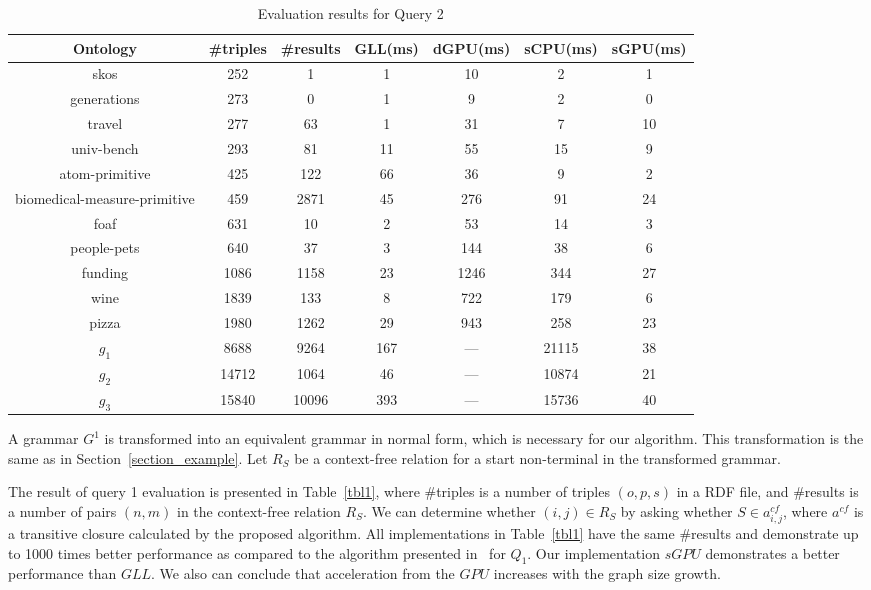 \documentclass[runningheads,a4paper]{llncs}
\begin{document}
\begin{table}[h]
	\centering
	\caption{Evaluation results for Query 2}
	\label{tbl2}
	
	\begin{tabular}{ | c | c | c | c | c | c | c |}
		\hline
		Ontology & \#triples & \#results & GLL(ms) & dGPU(ms) & sCPU(ms) & sGPU(ms) \\
		\hline 
		\hline
		skos        & 252 & 1 & 1 & 10 & 2 & 1\\
		generations & 273 & 0 & 1 & 9 & 2 & 0\\
		travel      & 277 & 63 & 1 & 31 & 7 & 10\\
		univ-bench  & 293 & 81 & 11 & 55 & 15 & 9\\
		atom-primitive & 425 & 122 & 66 & 36 & 9 & 2\\
		biomedical-measure-primitive & 459 & 2871 & 45 & 276 & 91 & 24\\
		foaf        & 631 & 10 & 2 & 53 & 14 & 3\\
		people-pets & 640 & 37 & 3 & 144 & 38 & 6\\
		funding     & 1086 & 1158 & 23 & 1246 & 344 & 27\\
		wine        & 1839 & 133 & 8 & 722 & 179 & 6\\
		pizza       & 1980 & 1262 & 29 & 943 & 258 & 23\\
		$g_{1}$     & 8688 & 9264 & 167 & --- & 21115 & 38\\
		$g_{2}$     & 14712 & 1064 & 46 & --- & 10874 & 21\\
		$g_{3}$     & 15840 & 10096 & 393 & --- & 15736 & 40\\
		\hline
	\end{tabular}
	
\end{table}


A grammar $G^1$ is transformed into an equivalent grammar in normal form, which is necessary for our algorithm. This transformation is the same as in Section~\ref{section_example}. Let $R_S$ be a context-free relation for a start non-terminal in the transformed grammar.

The result of query 1 evaluation is presented in Table~\ref{tbl1}, where \#triples is a number of triples $(o,p,s)$ in a RDF file, and \#results is a number of pairs $(n,m)$ in the context-free relation $R_S$. We can determine whether $(i,j) \in R_S$ by asking whether $S \in a^{cf}_{i,j}$, where $a^{cf}$ is a transitive closure calculated by the proposed algorithm. All implementations in Table~\ref{tbl1} have the same \#results and demonstrate up to 1000 times better performance as compared to the algorithm presented in~\cite{RDF} for $Q_1$. Our implementation $sGPU$ demonstrates a better performance than $GLL$. We also can conclude that acceleration from the $GPU$ increases with the graph size growth.
\end{document}
